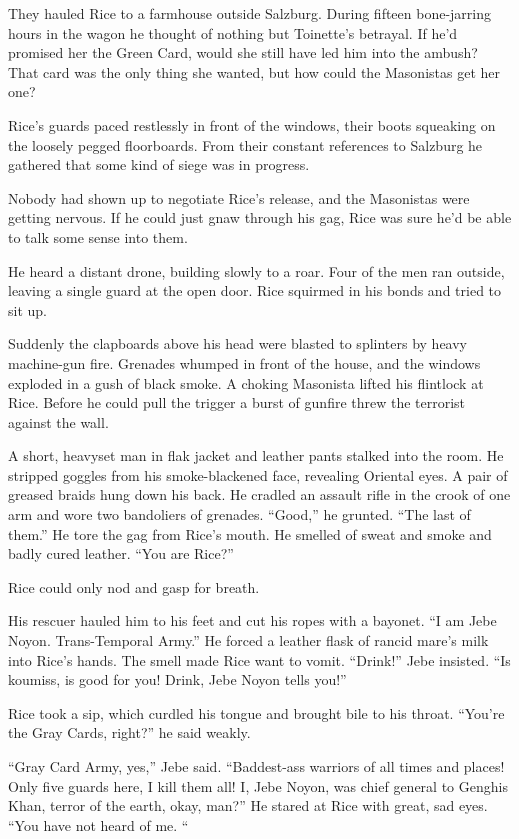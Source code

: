 They hauled Rice to a farmhouse outside Salzburg. During fifteen bone-jarring hours in the wagon he thought of nothing but Toinette’s betrayal. If he’d promised her the Green Card, would she still have led him into the ambush? That card was the only thing she wanted, but how could the Masonistas get her one?

Rice’s guards paced restlessly in front of the windows, their boots squeaking on the loosely pegged floorboards. From their constant references to Salzburg he gathered that some kind of siege was in progress.

Nobody had shown up to negotiate Rice’s release, and the Masonistas were getting nervous. If he could just gnaw through his gag, Rice was sure he’d be able to talk some sense into them.

He heard a distant drone, building slowly to a roar. Four of the men ran outside, leaving a single guard at the open door. Rice squirmed in his bonds and tried to sit up.

Suddenly the clapboards above his head were blasted to splinters by heavy machine-gun fire. Grenades whumped in front of the house, and the windows exploded in a gush of black smoke. A choking Masonista lifted his flintlock at Rice. Before he could pull the trigger a burst of gunfire threw the terrorist against the wall.

A short, heavyset man in flak jacket and leather pants stalked into the room. He stripped goggles from his smoke-blackened face, revealing Oriental eyes. A pair of greased braids hung down his back. He cradled an assault rifle in the crook of one arm and wore two bandoliers of grenades. “Good,” he grunted. “The last of them.” He tore the gag from Rice’s mouth. He smelled of sweat and smoke and badly cured leather. “You are Rice?”

Rice could only nod and gasp for breath.

His rescuer hauled him to his feet and cut his ropes with a bayonet. “I am Jebe Noyon. Trans-Temporal Army.” He forced a leather flask of rancid mare’s milk into Rice’s hands. The smell made Rice want to vomit. “Drink!” Jebe insisted. “Is koumiss, is good for you! Drink, Jebe Noyon tells you!”

Rice took a sip, which curdled his tongue and brought bile to his throat. “You’re the Gray Cards, right?” he said weakly.

“Gray Card Army, yes,” Jebe said. “Baddest-ass warriors of all times and places! Only five guards here, I kill them all! I, Jebe Noyon, was chief general to Genghis Khan, terror of the earth, okay, man?” He stared at Rice with great, sad eyes. “You have not heard of me. “

